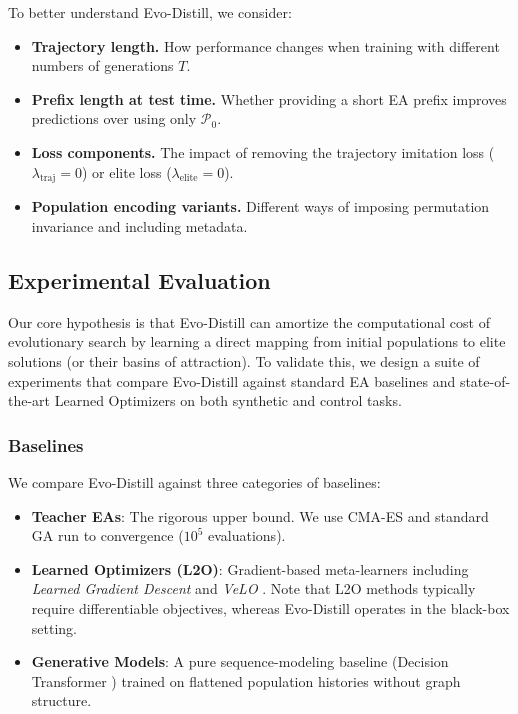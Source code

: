 \documentclass{article}
\begin{document}
To better understand Evo-Distill, we consider:
\begin{itemize}
    \item \textbf{Trajectory length.} How performance changes when training with different numbers of generations $T$.
    \item \textbf{Prefix length at test time.} Whether providing a short EA prefix improves predictions over using only $\mathcal{P}_0$.
    \item \textbf{Loss components.} The impact of removing the trajectory imitation loss ($\lambda_{\text{traj}}=0$) or elite loss ($\lambda_{\text{elite}}=0$).
    \item \textbf{Population encoding variants.} Different ways of imposing permutation invariance and including metadata.
\end{itemize}


\subsection{Experimental Evaluation}
\label{sec:experiments}

Our core hypothesis is that Evo-Distill can amortize the computational cost of evolutionary search by learning a direct mapping from initial populations to elite solutions (or their basins of attraction). To validate this, we design a suite of experiments that compare Evo-Distill against standard EA baselines and state-of-the-art Learned Optimizers on both synthetic and control tasks.

\subsubsection{Baselines}
We compare Evo-Distill against three categories of baselines:
\begin{itemize}
    \item \textbf{Teacher EAs}: The rigorous upper bound. We use CMA-ES and standard GA run to convergence ($10^5$ evaluations).
    \item \textbf{Learned Optimizers (L2O)}: Gradient-based meta-learners including \emph{Learned Gradient Descent} \cite{andrychowicz2016learning} and \emph{VeLO} \cite{metz2022velo}. Note that L2O methods typically require differentiable objectives, whereas Evo-Distill operates in the black-box setting.
    \item \textbf{Generative Models}: A pure sequence-modeling baseline (Decision Transformer \cite{chen2021decision}) trained on flattened population histories without graph structure.
\end{itemize}
\end{document}
